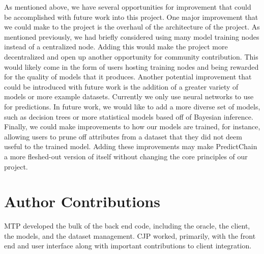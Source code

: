 \documentclass{ledger}
\begin{document}
As mentioned above, we have several opportunities for improvement that could be accomplished with future work
into this project.  One major improvement that we could make to the project is the overhaul of the architecture of
the project.  As mentioned previously, we had briefly considered using many model training nodes instead of a
centralized node.  Adding this would make the project more decentralized and open up another opportunity
for community contribution.  This would likely come in the form of users hosting training nodes and being rewarded for
the quality of models that it produces.  Another potential improvement that could be introduced with future work is
the addition of a greater variety of models or more example datasets.  Currently we only use neural networks to
use for predictions.  In future work, we would like to add a more diverse set of models, such as decision trees or
more statistical models based off of Bayesian inference.  Finally, we could make improvements to how our models are
trained, for instance, allowing users to prune off attributes from a dataset that they did not deem useful to the
trained model.  Adding these improvements may make PredictChain a more fleshed-out version of itself without changing
the core principles of our project.

\ledgernotes

\section*{Author Contributions}

MTP developed the bulk of the back end code, including the oracle, the client, the models, and the dataset management.
CJP worked, primarily, with the front end and user interface along with important contributions to client integration.








\end{document}
